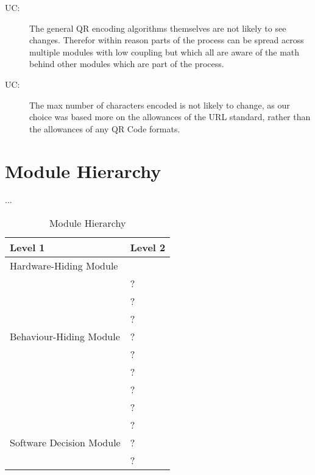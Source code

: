 \documentclass[12pt, titlepage]{article}
\newcounter{ucnum}
\newcommand{\uctheucnum}{UC\theucnum}
\newcounter{mnum}
\newcommand{\mthemnum}{M\themnum}
\begin{document}
\begin{description}
\item[ \uctheucnum \label{ucAlgorithms}:] 
The general QR encoding algorithms themselves are not likely to see changes. Therefor within reason parts of the process can be spread across multiple modules with low coupling but which all are aware of the math behind other modules which are part of the process.

\item[ \uctheucnum \label{ucInput}:] 
The max number of characters encoded is not likely to change, as our choice was based more on the allowances of the URL standard, rather than the allowances of any QR Code formats.

\end{description}

\section{Module Hierarchy} \label{SecMH}


\begin{description}
\item [ \mthemnum \label{mHH}:]
\item ...
\end{description}


\begin{table}[h!]
\centering
\begin{tabular}{p{} p{}}
\toprule
\textbf{Level 1} & \textbf{Level 2}\\
\midrule

{Hardware-Hiding Module} & ~ \\
\midrule

\multirow{7}{0.3\textwidth}{Behaviour-Hiding Module} & ?\\
& ?\\
& ?\\
& ?\\
& ?\\
& ?\\
& ?\\ 
& ?\\
\midrule

\multirow{3}{0.3\textwidth}{Software Decision Module} & {?}\\
& ?\\
& ?\\
\bottomrule

\end{tabular}
\caption{Module Hierarchy}
\label{TblMH}
\end{table}
\end{document}

